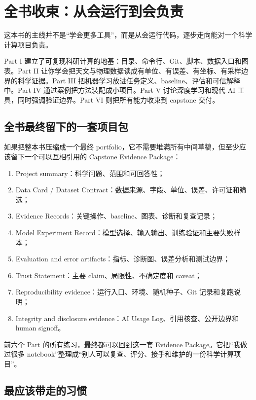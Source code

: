 \chapter*{全书收束：从会运行到会负责}

这本书的主线并不是“学会更多工具”，而是从会运行代码，逐步走向能对一个科学计算项目负责。

Part I 建立了可复现科研计算的地基：目录、命令行、Git、脚本、数据入口和图表。Part II 让你学会把天文与物理数据读成有单位、有误差、有坐标、有采样边界的科学证据。Part III 把机器学习放进任务定义、baseline、评估和可信解释中。Part IV 通过案例把方法装配成小项目。Part V 讨论深度学习和现代 AI 工具，同时强调验证边界。Part VI 则把所有能力收束到 capstone 交付。

\section*{全书最终留下的一套项目包}

如果把整本书压缩成一个最终 portfolio，它不需要堆满所有中间草稿，但至少应该留下一个可以互相引用的 Capstone Evidence Package：

\begin{enumerate}
    \item Project summary：科学问题、范围和可回答性；
    \item Data Card / Dataset Contract：数据来源、字段、单位、误差、许可证和筛选；
    \item Evidence Records：关键操作、baseline、图表、诊断和复查记录；
    \item Model Experiment Record：模型选择、输入输出、训练验证和主要失败样本；
    \item Evaluation and error artifacts：指标、诊断图、误差分析和测试边界；
    \item Trust Statement：主要 claim、局限性、不确定度和 caveat；
    \item Reproducibility evidence：运行入口、环境、随机种子、Git 记录和复跑说明；
    \item Integrity and disclosure evidence：AI Usage Log、引用核查、公开边界和 human signoff。
\end{enumerate}

前六个 Part 的所有练习，最终都可以回到这一套 Evidence Package。它把“我做过很多 notebook”整理成“别人可以复查、评分、接手和维护的一份科学计算项目”。

\section*{最应该带走的习惯}

